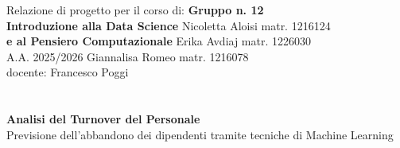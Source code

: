 \documentclass{article}
\begin{document}
\noindent\normalsize Relazione di progetto per il corso di: \hfill \textbf{Gruppo n. 12}\\
\textbf {Introduzione alla Data Science} \hfill Nicoletta Aloisi matr. 1216124\\
\textbf {e al Pensiero Computazionale} \hfill Erika Avdiaj matr. 1226030\\
\normalsize A.A. 2025/2026 \hfill Giannalisa Romeo matr. 1216078\\
\normalsize docente: Francesco Poggi\\
\\ \\
\noindent
\huge\textbf{Analisi del Turnover del Personale} \\  
\normalsize Previsione dell'abbandono dei dipendenti tramite tecniche di Machine Learning
\\ \\
\end{document}
